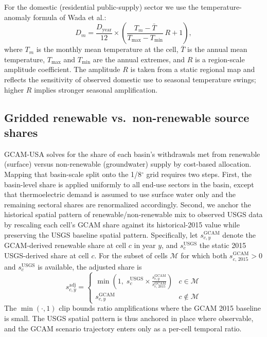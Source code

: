 \documentclass[fleqn,10pt]{wlscirep}
\begin{document}
For the domestic (residential public-supply) sector we use the temperature-anomaly formula of Wada et al.\cite{Wada2011}:
\begin{equation}
D_m = \frac{D_{\mathrm{year}}}{12} \times \left(\frac{T_m - \bar{T}}{T_{\max} - T_{\min}}\,R + 1\right),
\label{eq:dom-monthly}
\end{equation}
where $T_m$ is the monthly mean temperature at the cell, $\bar{T}$ is the annual mean temperature, $T_{\max}$ and $T_{\min}$ are the annual extremes, and $R$ is a region-scale amplitude coefficient. The amplitude $R$ is taken from a static regional map and reflects the sensitivity of observed domestic use to seasonal temperature swings; higher $R$ implies stronger seasonal amplification.

\subsection*{Gridded renewable vs.\ non-renewable source shares}

GCAM-USA solves for the share of each basin's withdrawals met from renewable (surface) versus non-renewable (groundwater) supply by cost-based allocation. Mapping that basin-scale split onto the 1/8$^{\circ}$ grid requires two steps. First, the basin-level share is applied uniformly to all end-use sectors in the basin, except that thermoelectric demand is assumed to use surface water only and the remaining sectoral shares are renormalized accordingly. Second, we anchor the historical spatial pattern of renewable/non-renewable mix to observed USGS data by rescaling each cell's GCAM share against its historical-2015 value while preserving the USGS baseline spatial pattern. Specifically, let $s^{\mathrm{GCAM}}_{c,y}$ denote the GCAM-derived renewable share at cell $c$ in year $y$, and $s^{\mathrm{USGS}}_c$ the static 2015 USGS-derived share at cell $c$. For the subset of cells $\mathcal{M}$ for which both $s^{\mathrm{GCAM}}_{c,\,2015}>0$ and $s^{\mathrm{USGS}}_c$ is available, the adjusted share is
\begin{equation}
s^{\mathrm{adj}}_{c,y} =
\begin{cases}
\displaystyle \min\!\left(1,\; s^{\mathrm{USGS}}_c \times \frac{s^{\mathrm{GCAM}}_{c,y}}{s^{\mathrm{GCAM}}_{c,\,2015}}\right) & c \in \mathcal{M} \\[10pt]
s^{\mathrm{GCAM}}_{c,y}                                                                                        & c \notin \mathcal{M}
\end{cases}
\label{eq:source-shares}
\end{equation}
The $\min(\cdot,1)$ clip bounds ratio amplifications where the GCAM 2015 baseline is small. The USGS spatial pattern is thus anchored in place where observable, and the GCAM scenario trajectory enters only as a per-cell temporal ratio.
\end{document}
